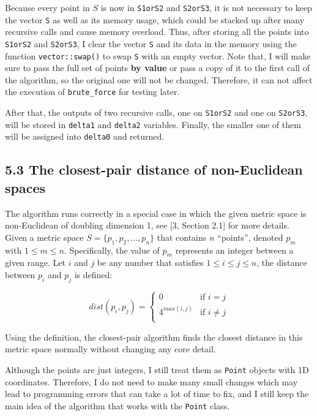 \documentclass[12pt,english,]{article}
\newcommand{\code}[1]{\colorbox{light-gray}{\texttt{#1}}}
\begin{document}
Because every point in \(S\) is now in \code{S1orS2} and \code{S2orS3},
it is not necessary to keep the vector \code{S} as well as its memory
usage, which could be stacked up after many recursive calls and cause
memory overload. Thus, after storing all the points into \code{S1orS2}
and \code{S2orS3}, I clear the vector \code{S} and its data in the
memory using the function \code{vector::swap()} to swap \code{S} with an
empty vector. Note that, I will make sure to pass the full set of points
\textbf{by value} or pass a copy of it to the first call of the
algorithm, so the original one will not be changed. Therefore, it can
not affect the execution of \code{brute\_force} for testing later.

After that, the outputs of two recursive calls, one on \code{S1orS2} and
one on \code{S2orS3}, will be stored in \code{delta1} and \code{delta2}
variables. Finally, the smaller one of them will be assigned into
\code{delta0} and returned.

\hypertarget{section5.3}{%
\subsection{5.3 The closest-pair distance of non-Euclidean
spaces}\label{section5.3}}

The algorithm runs correctly in a special case in which the given metric
space is non-Euclidean of doubling dimension 1, see {[}3, Section 2.1{]}
for more details. Given a metric space \(S = \{p_1, p_2,\ldots,p_n\}\)
that contains \(n\) ``points'', denoted \(p_m\) with
\(1 \leq m \leq n\). Specifically, the value of \(p_m\) represents an
integer between a given range. Let \(i\) and \(j\) be any number that
satisfies \(1 \leq i \leq j \leq n\), the distance between \(p_i\) and
\(p_j\) is defined:

\[
  dist(p_i, p_j) =
  \begin{cases}
  0 & \text{if $i=j$} \\
  4^{max(i,j)} & \text{if $i\neq j$} \\
  \end{cases}
\]

Using the definition, the closest-pair algorithm finds the closest
distance in this metric space normally without changing any core detail.

Although the points are just integers, I still treat them as
\code{Point} objects with 1D coordinates. Therefore, I do not need to
make many small changes which may lead to programming errors that can
take a lot of time to fix, and I still keep the main idea of the
algorithm that works with the \code{Point} class.
\end{document}
